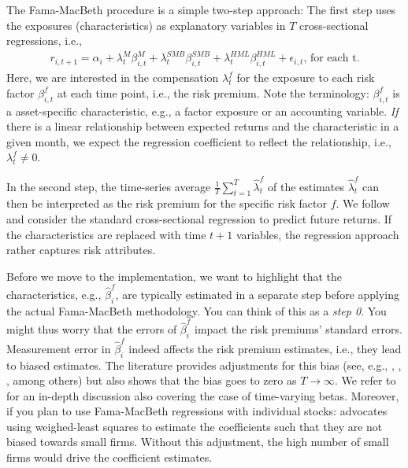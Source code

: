 \documentclass[
]{krantz}
\begin{document}
The Fama-MacBeth procedure is a simple two-step approach:
The first step uses the exposures (characteristics) as explanatory variables in \(T\) cross-sectional regressions, i.e.,
\[\begin{aligned}r_{i,t+1} = \alpha_i + \lambda^{M}_t \beta^M_{i,t}  + \lambda^{SMB}_t \beta^{SMB}_{i,t} + \lambda^{HML}_t \beta^{HML}_{i,t} + \epsilon_{i,t}\text{, for each t}.\end{aligned}\]
Here, we are interested in the compensation \(\lambda^{f}_t\) for the exposure to each risk factor \(\beta^{f}_{i,t}\) at each time point, i.e., the risk premium. Note the terminology: \(\beta^{f}_{i,t}\) is a asset-specific characteristic, e.g., a factor exposure or an accounting variable. \emph{If} there is a linear relationship between expected returns and the characteristic in a given month, we expect the regression coefficient to reflect the relationship, i.e., \(\lambda_t^{f}\neq0\).

In the second step, the time-series average \(\frac{1}{T}\sum\limits_{t=1}^T \hat\lambda^{f}_t\) of the estimates \(\hat\lambda^{f}_t\) can then be interpreted as the risk premium for the specific risk factor \(f\). We follow \citet{Zaffaroni2022} and consider the standard cross-sectional regression to predict future returns. If the characteristics are replaced with time \(t+1\) variables, the regression approach rather captures risk attributes.

Before we move to the implementation, we want to highlight that the characteristics, e.g., \(\hat\beta^{f}_{i}\), are typically estimated in a separate step before applying the actual Fama-MacBeth methodology. You can think of this as a \emph{step 0}. You might thus worry that the errors of \(\hat\beta^{f}_{i}\) impact the risk premiums' standard errors. Measurement error in \(\hat\beta^{f}_{i}\) indeed affects the risk premium estimates, i.e., they lead to biased estimates. The literature provides adjustments for this bias (see, e.g., \citet{Shanken1992}, \citet{Kim1995}, \citet{Chen2015}, among others) but also shows that the bias goes to zero as \(T \to \infty\). We refer to \citet{Gagliardini2016} for an in-depth discussion also covering the case of time-varying betas. Moreover, if you plan to use Fama-MacBeth regressions with individual stocks: \citet{Hou2020} advocates using weighed-least squares to estimate the coefficients such that they are not biased towards small firms. Without this adjustment, the high number of small firms would drive the coefficient estimates.
\end{document}
